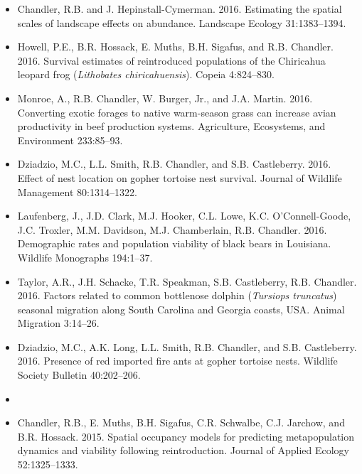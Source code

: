 \documentclass[12pt]{article}
\begin{document}
\begin{itemize}
\item Chandler, R.B. and J. Hepinstall-Cymerman. 2016. Estimating
  the spatial scales of landscape effects on abundance. Landscape
  Ecology 31:1383--1394. 

\item Howell, P.E., B.R. Hossack, E. Muths, B.H. Sigafus, and
  R.B. Chandler. 2016. Survival estimates of reintroduced populations
  of the Chiricahua leopard frog ({\it Lithobates
    chiricahuensis}). Copeia 4:824--830.   

\item Monroe, A., R.B. Chandler, W. Burger, Jr., and J.A. Martin. 2016. 
  Converting exotic forages to native warm-season grass can
  increase avian productivity in beef production systems. Agriculture,
  Ecosystems, and Environment 233:85--93. 

\item Dziadzio, M.C., L.L. Smith, R.B. Chandler, and
  S.B. Castleberry. 2016. Effect of nest location on gopher
  tortoise nest survival. Journal of Wildlife Management 80:1314--1322.

\item Laufenberg, J., J.D. Clark, M.J. Hooker, C.L. Lowe,
  K.C. O'Connell-Goode, J.C. Troxler, M.M. Davidson, M.J. Chamberlain,
  R.B. Chandler. 2016. Demographic rates and population viability
  of black bears in Louisiana. Wildlife Monographs 194:1--37.

\item Taylor, A.R., J.H. Schacke, T.R. Speakman, S.B. Castleberry,
  R.B. Chandler. 2016. Factors related to common bottlenose dolphin
  ({\it Tursiops truncatus}) seasonal migration along South Carolina
  and Georgia coasts, USA. Animal Migration 3:14--26.

\item Dziadzio, M.C., A.K. Long, L.L. Smith, R.B. Chandler, and
  S.B. Castleberry. 2016. Presence of red imported fire ants at
  gopher tortoise nests. Wildlife Society Bulletin 40:202--206.  


\item[] { \\}

\item Chandler, R.B., E. Muths, B.H. Sigafus, C.R. Schwalbe,
  C.J. Jarchow, and B.R. Hossack. 2015. Spatial occupancy models for
  predicting metapopulation dynamics and viability following
  reintroduction. Journal of Applied Ecology 52:1325--1333.


\end{itemize}
\end{document}
